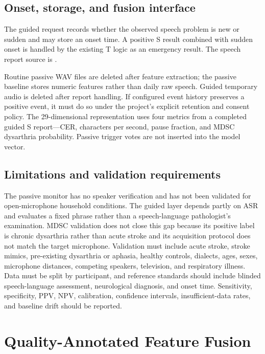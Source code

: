 \documentclass[11pt,a4paper]{article}
\begin{document}
\subsection{Onset, storage, and fusion interface}

The guided request records whether the observed speech problem is new or sudden and may store an onset time. A positive S result combined with sudden onset is handled by the existing T logic as an emergency result. The speech report source is .

Routine passive WAV files are deleted after feature extraction; the passive baseline stores numeric features rather than daily raw speech. Guided temporary audio is deleted after report handling. If configured event history preserves a positive event, it must do so under the project's explicit retention and consent policy. The 29-dimensional representation uses four metrics from a completed guided S report---CER, characters per second, pause fraction, and MDSC dysarthria probability. Passive trigger votes are not inserted into the model vector.

\subsection{Limitations and validation requirements}

The passive monitor has no speaker verification and has not been validated for open-microphone household conditions. The guided layer depends partly on ASR and evaluates a fixed phrase rather than a speech-language pathologist's examination. MDSC validation does not close this gap because its positive label is chronic dysarthria rather than acute stroke and its acquisition protocol does not match the target microphone. Validation must include acute stroke, stroke mimics, pre-existing dysarthria or aphasia, healthy controls, dialects, ages, sexes, microphone distances, competing speakers, television, and respiratory illness. Data must be split by participant, and reference standards should include blinded speech-language assessment, neurological diagnosis, and onset time. Sensitivity, specificity, PPV, NPV, calibration, confidence intervals, insufficient-data rates, and baseline drift should be reported.

\section{Quality-Annotated Feature Fusion}
\end{document}

